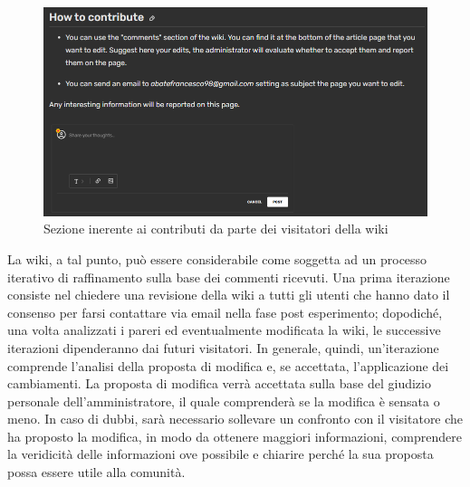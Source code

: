 \begin{figure}[h!]
    \centering
    \includegraphics[width=420pt]{figure/catalog/contribute.png}
    \caption{Sezione inerente ai contributi da parte dei visitatori della wiki}
    \label{wiki-contribute}
\end{figure}

La wiki, a tal punto, può essere considerabile come soggetta ad un processo iterativo di raffinamento sulla base dei commenti ricevuti. Una prima iterazione consiste nel chiedere una revisione della wiki a tutti gli utenti che hanno dato il consenso per farsi contattare via email nella fase post esperimento; dopodiché, una volta analizzati i pareri ed eventualmente modificata la wiki, le successive iterazioni dipenderanno dai futuri visitatori. In generale, quindi, un'iterazione comprende l'analisi della proposta di modifica e, se accettata, l'applicazione dei cambiamenti. La proposta di modifica verrà accettata sulla base del giudizio personale dell'amministratore, il quale comprenderà se la modifica è sensata o meno. In caso di dubbi, sarà necessario sollevare un confronto con il visitatore che ha proposto la modifica, in modo da ottenere maggiori informazioni, comprendere la veridicità delle informazioni ove possibile e chiarire perché la sua proposta possa essere utile alla comunità.

\newpage